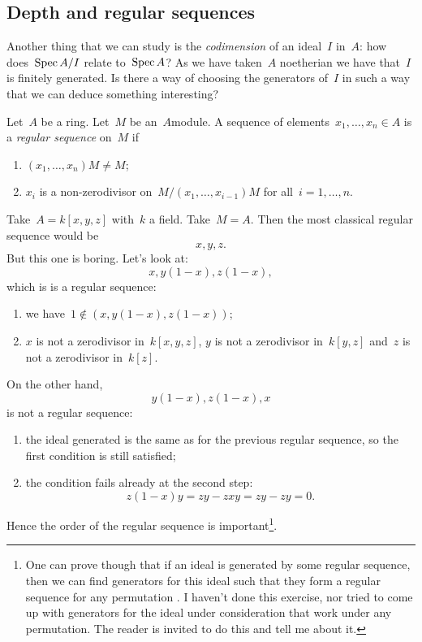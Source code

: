 \documentclass[10pt,a4paper]{article}
\begin{document}
\subsection{Depth and regular sequences}
Another thing that we can study is the \emph{codimension} of an ideal~$I$ in~$A$: how does~$\operatorname{Spec} A/I$ relate to~$\operatorname{Spec} A$? As we have taken~$A$ noetherian we have that~$I$ is finitely generated. Is there a way of choosing the generators of~$I$ in such a way that we can deduce something interesting?
\begin{definition}
  Let~$A$ be a ring. Let~$M$ be an~$A$\dash module. A sequence of elements~$x_1,\dotsc,x_n\in A$ is a \emph{regular sequence} on~$M$ if
  \begin{enumerate}
    \item $(x_1,\dotsc,x_n)M\neq M$;
    \item $x_i$ is a non-zerodivisor on~$M/(x_1,\dotsc,x_{i-1})M$ for all~$i=1,\dotsc,n$.
  \end{enumerate}
\end{definition}
\begin{example}
  Take~$A=k[x,y,z]$ with~$k$ a field. Take~$M=A$. Then the most classical regular sequence would be
  \begin{equation}
    x,y,z.
  \end{equation}
  But this one is boring. Let's look at:
  \begin{equation}
    x,y(1-x),z(1-x),
  \end{equation}
  which is is a regular sequence:
  \begin{enumerate}
    \item we have~$1\notin(x,y(1-x),z(1-x))$;
    \item $x$ is not a zerodivisor in~$k[x,y,z]$, $y$ is not a zerodivisor in~$k[y,z]$ and~$z$ is not a zerodivisor in~$k[z]$.
  \end{enumerate}
  On the other hand,
  \begin{equation}
    y(1-x),z(1-x),x
  \end{equation}
  is not a regular sequence:
  \begin{enumerate}
    \item the ideal generated is the same as for the previous regular sequence, so the first condition is still satisfied;
    \item the condition fails already at the second step:
      \begin{equation}
        z(1-x)y=zy-zxy=zy-zy=0.
      \end{equation}
  \end{enumerate}
  Hence the order of the regular sequence is important\footnote{One can prove though that if an ideal is generated by some regular sequence, then we can find generators for this ideal such that they form a regular sequence for any permutation \cite[exercise 17.6]{eisenbud-commutative-algebra}. I haven't done this exercise, nor tried to come up with generators for the ideal under consideration that work under any permutation. The reader is invited to do this and tell me about it.}.
\end{example}
\end{document}
